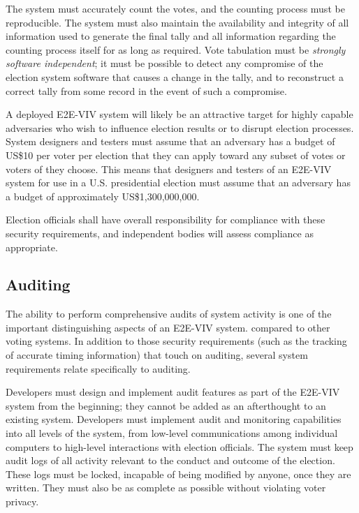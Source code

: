 The system must accurately count the votes, and the counting process
must be reproducible. The system must also maintain the availability
and integrity of all information used to generate the final tally and
all information regarding the counting process itself for as long as
required. Vote tabulation must be \emph{strongly software
  independent}; it must be possible to detect any compromise of the
election system software that causes a change in the tally, and to
reconstruct a correct tally from some record in the event of such a
compromise.

A deployed E2E-VIV system will likely be an attractive target for
highly capable adversaries who wish to influence election results or
to disrupt election processes. System designers and testers must
assume that an adversary has a budget of US\$10 per voter per election
that they can apply toward any subset of votes or voters of they
choose. This means that designers and testers of an E2E-VIV system for
use in a U.S. presidential election must assume that an adversary has
a budget of approximately US\$1,300,000,000.

Election officials shall have overall responsibility for compliance
with these security requirements, and independent bodies will assess
compliance as appropriate.

\subsection{Auditing}

The ability to perform comprehensive audits of system activity is one
of the important distinguishing aspects of an E2E-VIV system.
compared to other voting systems. In addition to those security
requirements (such as the tracking of accurate timing information)
that touch on auditing, several system requirements relate
specifically to auditing.

Developers must design and implement audit features as part of the
E2E-VIV system from the beginning; they cannot be added as an
afterthought to an existing system. Developers must implement audit
and monitoring capabilities into all levels of the system, from
low-level communications among individual computers to high-level
interactions with election officials. The system must keep audit logs
of all activity relevant to the conduct and outcome of the
election. These logs must be locked, incapable of being modified by
anyone, once they are written. They must also be as complete as
possible without violating voter privacy.

